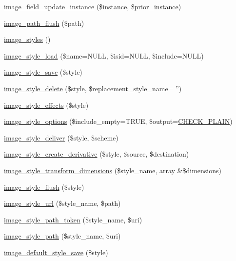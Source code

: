 \begin{DoxyCompactItemize}
\item 
\hyperlink{image_8module_a3ee06b052a9a2a8372874966c24fbca7}{image\_\-field\_\-update\_\-instance} (\$instance, \$prior\_\-instance)
\item 
\hyperlink{image_8module_a842cc641e4d7c7f1e403d400e92ec2ce}{image\_\-path\_\-flush} (\$path)
\item 
\hyperlink{image_8module_a2c68836c891747cbd10954b0acf34a71}{image\_\-styles} ()
\item 
\hyperlink{image_8module_a0d7388bec5f42788968823a8099a64a7}{image\_\-style\_\-load} (\$name=NULL, \$isid=NULL, \$include=NULL)
\item 
\hyperlink{image_8module_a181d174a5071727c4d0f24103dfb2b9d}{image\_\-style\_\-save} (\$style)
\item 
\hyperlink{image_8module_a83cfe6d842e5f7860914cf449f1ba47c}{image\_\-style\_\-delete} (\$style, \$replacement\_\-style\_\-name= '')
\item 
\hyperlink{image_8module_a5bc8f07cdbaa380732137a12020877da}{image\_\-style\_\-effects} (\$style)
\item 
\hyperlink{image_8module_a2c69d85e23ccb050a6f01832f41d3e5a}{image\_\-style\_\-options} (\$include\_\-empty=TRUE, \$output=\hyperlink{bootstrap_8inc_a7b115778ff532867b7af4c53d39a1de2}{CHECK\_\-PLAIN})
\item 
\hyperlink{image_8module_a80cd974ca58e2f9aaee8a655497d2db7}{image\_\-style\_\-deliver} (\$style, \$scheme)
\item 
\hyperlink{image_8module_ac097959664fd40ab625104fb98090ee3}{image\_\-style\_\-create\_\-derivative} (\$style, \$source, \$destination)
\item 
\hyperlink{image_8module_a4cde7d67cc8cce2fa6fc3a11880947f8}{image\_\-style\_\-transform\_\-dimensions} (\$style\_\-name, array \&\$dimensions)
\item 
\hyperlink{image_8module_a18ea35a0e02f61a447a0851b78e1e556}{image\_\-style\_\-flush} (\$style)
\item 
\hyperlink{image_8module_a306cf59855e3462ac9539850d4c763eb}{image\_\-style\_\-url} (\$style\_\-name, \$path)
\item 
\hyperlink{image_8module_a97eaa4de01dc69378e7fc314438abe5a}{image\_\-style\_\-path\_\-token} (\$style\_\-name, \$uri)
\item 
\hyperlink{image_8module_a993e0bcd2c632aa81deb0da7e3baa84c}{image\_\-style\_\-path} (\$style\_\-name, \$uri)
\item 
\hyperlink{image_8module_a6070f04fce978050d271f4777bc10bea}{image\_\-default\_\-style\_\-save} (\$style)

\end{DoxyCompactItemize}
